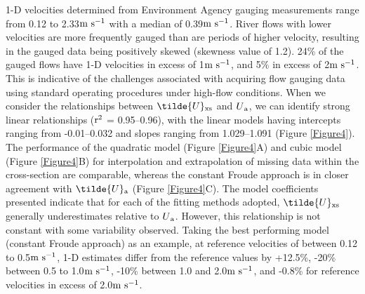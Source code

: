 \documentclass[hess, manuscript]{copernicus}
\begin{document}
1-D velocities determined from Environment Agency gauging measurements range from 0.12 to 2.33$\textnormal{m s\textsuperscript{-1}}$ with a median of 0.39$\textnormal{m s\textsuperscript{-1}}$. River flows with lower velocities are more frequently gauged than are periods of higher velocity, resulting in the gauged data being positively skewed (skewness value of 1.2). 24\% of the gauged flows have 1-D velocities in excess of 1$\textnormal{m s\textsuperscript{-1}}$, and 5\% in excess of 2$\textnormal{m s\textsuperscript{-1}}$. This is indicative of the challenges associated with acquiring flow gauging data using standard operating procedures under high-flow conditions. When we consider the relationships between $\tilde{U}\textsubscript{xs}$ and $U\textsubscript{a}$, we can identify strong linear relationships ($\textnormal{r\textsuperscript{2}}$ = 0.95--0.96), with the linear models having intercepts ranging from -0.01--0.032 and slopes ranging from 1.029--1.091 (Figure \ref{Figure4}). The performance of the quadratic model (Figure \ref{Figure4}A) and cubic model (Figure \ref{Figure4}B) for interpolation and extrapolation of missing data within the cross-section are comparable, whereas the constant Froude approach is in closer agreement with $\tilde{U}\textsubscript{a}$ (Figure \ref{Figure4}C). The model coefficients presented indicate that for each of the fitting methods adopted, $\tilde{U}\textsubscript{xs}$ generally underestimates relative to $U\textsubscript{a}$. However, this relationship is not constant with some variability observed. Taking the best performing model (constant Froude approach) as an example, at reference velocities of between 0.12 to 0.5$\textnormal{m s\textsuperscript{-1}}$, 1-D estimates differ from the reference values by +12.5\%, -20\% between 0.5 to 1.0$\textnormal{m s\textsuperscript{-1}}$, -10\% between 1.0 and 2.0$\textnormal{m s\textsuperscript{-1}}$, and -0.8\% for reference velocities in excess of 2.0$\textnormal{m s\textsuperscript{-1}}$.
\end{document}

